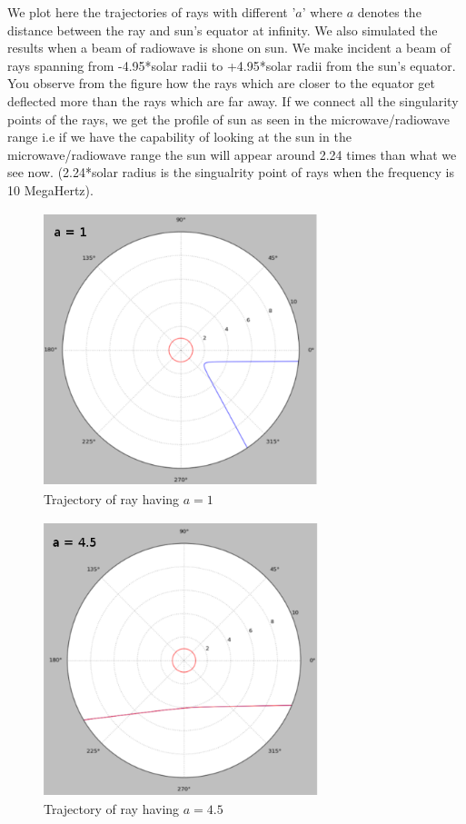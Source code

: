 \documentclass[journal]{IEEEtran}
\begin{document}
We plot here the trajectories of rays with different '$a$' where $a$ denotes the distance between the ray and sun's equator at infinity. We also simulated the results when a beam of radiowave is shone on sun. We make incident a beam of rays spanning from -4.95*solar radii to  +4.95*solar radii from the sun's equator. You observe from the figure how the rays which are closer to the equator get deflected more than the rays which are far away. If we connect all the singularity points of the rays, we get the profile of sun as seen in the microwave/radiowave range i.e if we have the capability of looking at the sun in the microwave/radiowave range the sun will appear around 2.24 times than what we see now. (2.24*solar radius is the singualrity point of rays when the frequency is 10 MegaHertz).  


\begin{figure}[h!]
  \includegraphics[width=8cm, height=8cm]{a=1.png}
 \caption{Trajectory of ray having $a = 1$}  
  \label{fig:result2}
\end{figure}  
  
\begin{figure}[h!]
  \includegraphics[width=8cm, height=8cm]{a=4dot5.png}
 \caption{Trajectory of ray having $a=4.5$}
  \label{fig:result3}  
\end{figure}
\end{document}
